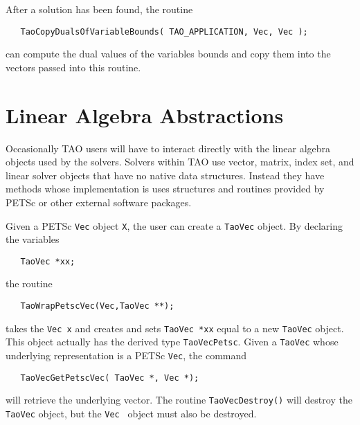 After a solution has been found, the routine
\begin{verbatim}
   TaoCopyDualsOfVariableBounds( TAO_APPLICATION, Vec, Vec );
\end{verbatim}
\noindent
can compute the dual values of the variables bounds and copy them
into the vectors passed into this routine.


\section{Linear Algebra Abstractions}

Occasionally TAO users will have to interact directly with the linear
algebra objects used by the solvers.   Solvers within TAO use 
vector, matrix, index set, and linear solver objects that have no
native data structures. Instead they have methods whose implementation
is uses structures and routines provided by PETSc or other external
software packages.

  Given a PETSc {\tt Vec} object {\tt X}, the user can create a {\tt TaoVec} object. 
By declaring the variables 
\begin{verbatim}
   TaoVec *xx;
\end{verbatim}
\noindent
the routine
\begin{verbatim}
   TaoWrapPetscVec(Vec,TaoVec **); 
\end{verbatim}
\noindent
takes the {\tt Vec x} and creates and sets {\tt TaoVec *xx} equal to
a new {\tt TaoVec} object.   This object actually has the derived
type {\tt TaoVecPetsc}.
Given a {\tt TaoVec} whose underlying representation is a PETSc {\tt Vec},
the command
\begin{verbatim}
   TaoVecGetPetscVec( TaoVec *, Vec *);
\end{verbatim}
\noindent
will retrieve the underlying vector.
The routine {\tt TaoVecDestroy()} will destroy the {\tt TaoVec} object,
but the {\tt Vec } object must also be destroyed.

